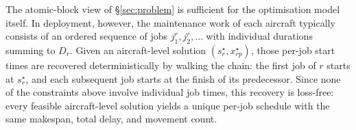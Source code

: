 The atomic-block view of \S\ref{sec:problem} is sufficient for the
optimisation model itself.  In deployment, however, the maintenance work
of each aircraft typically consists of an ordered sequence of jobs
$j^r_1, j^r_2, \ldots$ with individual durations summing to $D_r$.  Given
an aircraft-level solution $(s_r^\star, x_{rp}^\star)$, those per-job
start times are recovered deterministically by walking the chain: the
first job of $r$ starts at $s_r^\star$, and each subsequent job starts at
the finish of its predecessor.  Since none of the constraints above
involve individual job times, this recovery is loss-free: every feasible
aircraft-level solution yields a unique per-job schedule with the same
makespan, total delay, and movement count.
